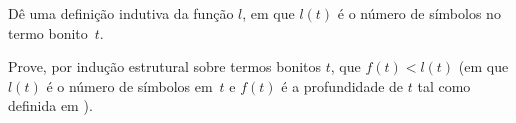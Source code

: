 \documentclass[../../../include/open-logic-section]{subfiles}
\begin{document}
\begin{prob}
  Dê uma definição indutiva da função $l$, em que $l(t)$ é
  o número de símbolos no termo bonito~$t$.
\end{prob}

\begin{prob}
  Prove, por indução estrutural sobre termos bonitos $t$, que $f(t) < l(t)$ (em que
  $l(t)$ é o número de símbolos em~$t$ e $f(t)$ é a profundidade de
  $t$ tal como definida em ).
\end{prob}
\end{document}
